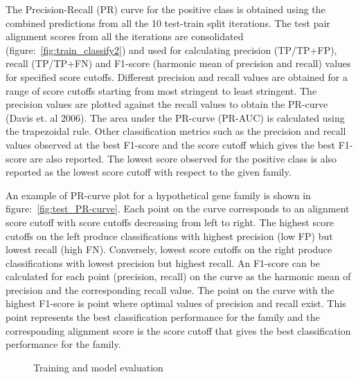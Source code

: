 \documentclass{article}
\begin{document}
			The Precision-Recall (PR) curve for the positive class is obtained using the combined predictions from all the 10 test-train split iterations. The test pair alignment scores from all the iterations are consolidated (figure:~\ref{fig:train_classify2}) and used for calculating precision (TP/TP+FP), recall (TP/TP+FN) and F1-score (harmonic mean of precision and recall) values for specified score cutoffs. Different precision and recall values are obtained for a range of score cutoffs starting from most stringent to least stringent. The precision values are plotted against the recall values to obtain the PR-curve (Davis et. al 2006). The area under the PR-curve (PR-AUC) is calculated using the trapezoidal rule. Other classification metrics such as the precision and recall values observed at the best F1-score and the score cutoff which gives the best F1-score are also reported. The lowest score observed for the positive class is also reported as the lowest score cutoff with respect to the given family. 
			
			An example of PR-curve plot for a hypothetical gene family is shown in figure:~\ref{fig:test_PR-curve}. Each point on the curve corresponds to an alignment score cutoff with score cutoffs decreasing from left to right. The highest score cutoffs on the left produce classifications with highest precision (low FP) but lowest recall (high FN). Conversely, lowest score cutoffs on the right produce classifications with lowest precision but highest recall. An F1-score can be calculated for each point (precision, recall) on the curve as the harmonic mean of precision and the corresponding recall value. The point on the curve with the highest F1-score is point where optimal values of precision and recall exist. This point represents the best classification performance for the family and the corresponding alignment score is the score cutoff that gives the best classification performance for the family.
			
			\begin{figure}
				\caption{Training and model evaluation}
				\label{fig:train_classify1}
			\end{figure}
			
\end{document}
